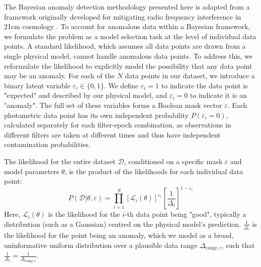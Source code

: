 The Bayesian anomaly detection methodology presented here is adapted from a framework originally developed for mitigating radio frequency interference in 21cm cosmology \citep{Leeney2022, Anstey2023, Roque2023, de2022reach}. To account for anomalous data within a Bayesian framework, we formulate the 
problem as a model selection task at the level of individual data points. A 
standard likelihood, which assumes all data points are drawn from a single 
physical model, cannot handle anomalous data points. To address this, we reformulate the 
likelihood to explicitly model the possibility that any data point may be an 
anomaly. For each of the $N$ data points in our dataset, we introduce a binary 
latent variable $\varepsilon_i \in \{0, 1\}$. We define $\varepsilon_i=1$ to 
indicate the data point is "expected" and described by our physical model, and 
$\varepsilon_i=0$ to indicate it is an "anomaly". The 
full set of these variables forms a Boolean mask vector $\varepsilon$. Each photometric data point has its own independent probability $P(\varepsilon_i=0)$, calculated separately for each filter-epoch combination, as observations in different filters are taken at different times and thus have independent contamination probabilities.

The likelihood for the entire dataset $\mathcal{D}$, conditioned on a specific mask $\varepsilon$ and model parameters $\theta$, is the product of the likelihoods for each individual data point:
\begin{equation}
    P(\mathcal{D} | \theta, \varepsilon) = \prod_{i=1}^{N} \left[\mathcal{L}_i(\theta)\right]^{\varepsilon_i} \left[\frac{1}{\Delta_i}\right]^{1-\varepsilon_i}
\end{equation}
Here, $\mathcal{L}_i(\theta)$ is the likelihood for the $i$-th data point being "good", typically a distribution (such as a Gaussian) centred on the physical model's prediction. $\frac{1}{\Delta_i}$ is the likelihood for the point being an anomaly, which we model as a broad, uninformative uniform distribution over a plausible data range $\Delta_{\mathrm{range},i}$, such that $\frac{1}{\Delta_i} = \frac{1}{\Delta_{\mathrm{range},i}}$.

